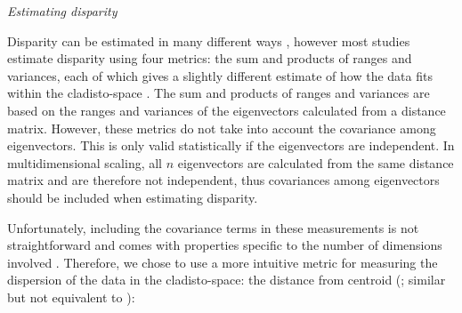 \documentclass[12pt,letterpaper]{article}
\renewcommand{\subsection}[1]{%
\bigskip
\begin{center}
\begin{large}
\normalfont\itshape #1
\end{large}
\end{center}}
\begin{document}
\subsection{Estimating disparity}
Disparity can be estimated in many different ways \citep[e.g.][]{Ciampaglio2004,thorneresetting2011,hopkinsdecoupling2013,huang2015origins}, however most studies estimate disparity using four metrics: the sum and products of ranges and variances, each of which gives a slightly different estimate of how the data fits within the cladisto-space \citep{Foote01071994,Wills1994,brusatte50,Brusatte12092008,cisneros2010,thorneresetting2011,prentice2011,brusattedinosaur2012,toljagictriassic-jurassic2013,ruta2013,bentonmodels2014,bensonfaunal2014}.
The sum and products of ranges and variances are based on the ranges and variances of the eigenvectors calculated from a distance matrix.
However, these metrics do not take into account the covariance among eigenvectors.
This is only valid statistically if the eigenvectors are independent.
In multidimensional scaling, all $n$ eigenvectors are calculated from the same distance matrix and are therefore not independent, thus covariances among eigenvectors should be included when estimating disparity.


Unfortunately, including the covariance terms in these measurements
is not straightforward and comes with properties specific to the number of dimensions involved \citep{Jackson,DonohueDim}. %
Therefore, we chose to use a more intuitive metric for measuring the dispersion of the data in the cladisto-space: the distance from centroid (\citealt{finlay2015morphological}; similar but not equivalent to \citealt{kornextinction2013,huang2015origins}):
\end{document}
